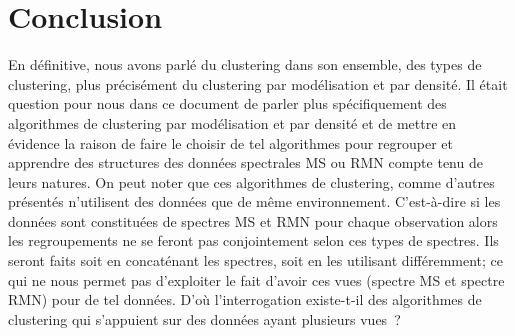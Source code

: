 \documentclass[12pt, french, latin.medieval, a4paper]{report}
\begin{document}
        
\section{Conclusion}

    En définitive, nous avons parlé du clustering dans son ensemble, des types de clustering, plus précisément du clustering par modélisation et par densité. Il était question pour nous dans ce document de parler plus spécifiquement des algorithmes de clustering par modélisation et par densité et de mettre en évidence la raison de faire le choisir de tel algorithmes pour regrouper et apprendre des structures des données spectrales MS ou RMN compte tenu de leurs natures. On peut noter que ces algorithmes de clustering, comme d’autres présentés n’utilisent des données que de même environnement. C’est-à-dire si les données sont constituées de spectres MS et RMN pour chaque observation alors les regroupements ne se feront pas conjointement selon ces types de spectres. Ils seront faits soit en concaténant les spectres, soit en les utilisant différemment; ce qui ne nous permet pas d’exploiter le fait d’avoir ces vues (spectre MS et spectre RMN) pour de tel données. D’où l’interrogation existe-t-il des algorithmes de clustering qui s’appuient sur des données ayant plusieurs vues ?


    
\end{document}
